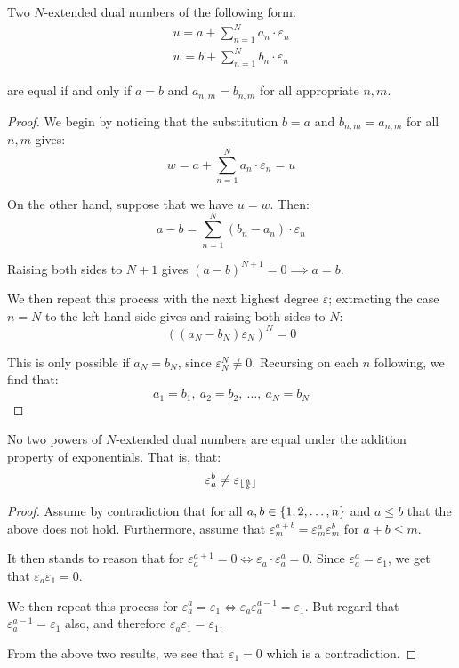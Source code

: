 \begin{theorem}
    Two $N$-extended dual numbers of the following form:
    \begin{align*}
        u=a+\sum_{n=1}^{N}{a_n\cdot\varepsilon_{n}} \\
        w=b+\sum_{n=1}^{N}{b_n\cdot\varepsilon_{n}}
    \end{align*}

    are equal if and only if $a=b$ and $a_{n,m}=b_{n,m}$ for all appropriate $n,m$.

    \begin{proof}
        We begin by noticing that the substitution $b=a$ and $b_{n,m}=a_{n,m}$ for all $n,m$ gives:
        $$
            w=a+\sum_{n=1}^{N}{a_n\cdot\varepsilon_{n}}=u
        $$

        On the other hand, suppose that we have $u=w$. Then:
        $$
            a-b=\sum_{n=1}^{N}{(b_n-a_n)\cdot\varepsilon_{n}}
        $$

        Raising both sides to $N+1$ gives $(a-b)^{N+1}=0\implies a=b$.

        We then repeat this process with the next highest degree $\varepsilon$; extracting the case $n=N$ to the left hand side gives and raising both sides to $N$:
        $$
            ((a_N-b_N)\varepsilon_N)^{N}=0
        $$

        This is only possible if $a_N=b_N$, since $\varepsilon_N^N\neq 0$. Recursing on each $n$ following, we find that:
        $$
            a_1=b_1,\ a_2=b_2,\ \dots,\ a_N=b_N
        $$
    \end{proof}
\end{theorem}

\begin{theorem}
    No two powers of $N$-extended dual numbers are equal under the addition property of exponentials. That is, that:
    $$
        \varepsilon_{a}^{b}\neq \varepsilon_{\lfloor\frac{a}{b}\rfloor}
    $$

    \begin{proof}
        Assume by contradiction that for all $a,b\in\{1,2,\dots,n\}$ and $a\leq b$ that the above does not hold. Furthermore, assume that $\varepsilon_m^{a+b}=\varepsilon_m^a\varepsilon_m^b$ for $a+b\leq m$.

        It then stands to reason that for $\varepsilon_{a}^{a+1}=0\iff\varepsilon_a\cdot\varepsilon_a^a=0$. Since $\varepsilon_a^a=\varepsilon_1$, we get that $\varepsilon_a\varepsilon_1=0$.

        We then repeat this process for $\varepsilon_a^a=\varepsilon_1\iff\varepsilon_a\varepsilon_a^{a-1}=\varepsilon_1$. But regard that $\varepsilon_a^{a-1}=\varepsilon_1$ also, and therefore $\varepsilon_a\varepsilon_1=\varepsilon_1$.

        From the above two results, we see that $\varepsilon_1=0$ which is a contradiction.
    \end{proof}
\end{theorem}

